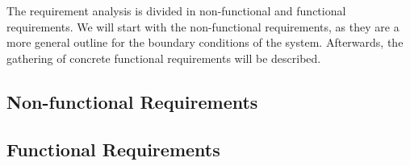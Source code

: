 The requirement analysis is divided in non-functional and functional requirements.
We will start with the non-functional requirements, as they are a more general outline for the boundary conditions of the system.
Afterwards, the gathering of concrete functional requirements will be described.

\subsection{\label{sec::Non-functionalRequirements}Non-functional Requirements}

\subsection{\label{sec::FunctionalRequirements}Functional Requirements}
